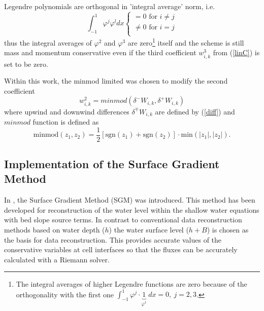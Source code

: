   Legendre polynomials are orthogonal in 'integral average' norm, i.e.
\begin{equation}
\int_{-1}^{1} \varphi^j \varphi^l dx \begin{cases}
=0 \text{ for }i\neq j\\
\neq 0 \text{ for }i=j\\
\end{cases}
\end{equation}
thus the integral averages of $\varphi^2$ and $\varphi^3$ are zero\footnote{The integral averages of higher Legendre functions are zero because of the orthogonality with the first one $\int_{-1}^{1} \varphi^{j}\cdot \underbrace{1}\limits_{\varphi^{1}} \ dx=0, \ j=2,3$.} itself and the scheme is still mass and momentum conservative even if the third coefficient $w_{i,k}^{3}$ from (\ref{linC}) is set to be zero.


 Within this work, the minmod limited was chosen to modify the second coefficient
\begin{equation}\label{clasLim}
w_{i,k}^{2}=minmod(\delta^- W_{i,k},\delta^+ W_{i,k})
\end{equation}
where upwind and downwind differences $\delta^\mp W_{i,k}$ are defined by (\ref{diff}) and $minmod$ function is defined as \cite{Nessyahu}
\begin{equation}\label{limiter}
\text{minmod}(z_1,z_2)=\frac{1}{2}[\text{sgn}(z_1) + \text{sgn}(z_2)] \cdot \text{min}(|z_1|, |z_2|).
\end{equation}

\subsection{Implementation of the Surface Gradient Method}
In \cite{Zhou2001}, the Surface Gradient Method (SGM) was introduced. This method has been developed for reconstruction of the water level within the shallow water equations with bed slope source terms. In contrast
to conventional data reconstruction methods based on water depth ($h$) the
water surface level ($h+B$) is chosen as the basis for data reconstruction. This provides
accurate values of the conservative variables at cell interfaces so that the fluxes can
be accurately calculated with a Riemann solver.

